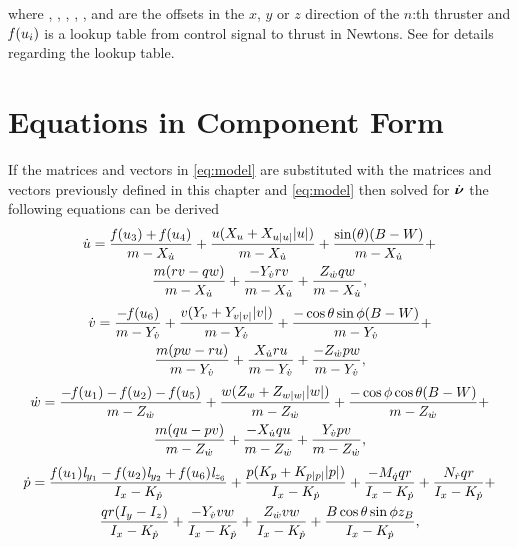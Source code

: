 where , , , , ,  and  are the offsets in the $x$, $y$ or $z$ direction of the $n$:th thruster and $\mathit{f}(u_{i})$ is a lookup table from control signal to thrust in Newtons. See  for details regarding the lookup table.

\section{Equations in Component Form}
If the matrices and vectors in \eqref{eq:model} are substituted with the matrices and vectors previously defined in this chapter and \eqref{eq:model} then solved for $\dot{\boldsymbol{\nu}}$ the following equations can be derived 
\begin{multline} \label{eq:u_dot}
\dot{u} = \frac{\mathit{f}(u_{3}) + \mathit{f}(u_{4})}{m -X_{\dot{u}}} + \frac{u (X_{u} + X_{u|u|} |u|)}{m -X_{\dot{u}}} + \frac{\sin(\theta)(B - W)}{m -X_{\dot{u}}} +\\
\frac{m(r v - q w )}{m -X_{\dot{u}}} + \frac{-Y_{\dot{v}} r v}{m -X_{\dot{u}}} + \frac{Z_{\dot{w}} q w}{m -X_{\dot{u}}},
\end{multline}
\begin{multline} \label{eq:v_dot}
\dot{v} = \frac{-\mathit{f}(u_{6})}{m - Y_{\dot{v}}} + \frac{v (Y_{v} + Y_{v|v|} |v|)}{m - Y_{\dot{v}}} + \frac{-\cos{\theta} \sin{\phi}(B - W)}{m - Y_{\dot{v}}} +\\ \frac{m(p w - r u)}{m - Y_{\dot{v}}} + \frac{X_{\dot{u}} r u}{m - Y_{\dot{v}}} + \frac{-Z_{\dot{w}} p w}{m - Y_{\dot{v}}},
\end{multline}
\begin{multline} \label{eq:w_dot}
\dot{w} = \frac{-\mathit{f}(u_{1}) - \mathit{f}(u_{2}) - \mathit{f}(u_{5})}{m - Z_{\dot{w}}} + \frac{w (Z_{w} + Z_{w|w|} |w|)}{m - Z_{\dot{w}}} + \frac{-\cos{\phi}\cos{\theta}(B - W)}{m - Z_{\dot{w}}} +\\
\frac{m (q u - p v)}{m - Z_{\dot{w}}} + \frac{-X_{\dot{u}} q u}{m - Z_{\dot{w}}} + \frac{Y_{\dot{v}} p v}{m - Z_{\dot{w}}},
\end{multline}
\begin{multline} \label{eq:p_dot}
\dot{p} = \frac{\mathit{f}(u_{1}) \mathit{l}_{y_{1}} - \mathit{f}(u_{2}) \mathit{l}_{y_{2}} + \mathit{f}(u_{6}) \mathit{l}_{z_{6}}}{I_{x} - K_{\dot{p}}} + \frac{p (K_{p} + K_{p|p|} |p|)}{I_{x} - K_{\dot{p}}} + \frac{-M_{\dot{q}} q r}{I_{x} - K_{\dot{p}}} + \frac{N_{\dot{r}} q r}{I_{x} - K_{\dot{p}}} +\\
\frac{q r (I_{y} - I_{z})}{I_{x} - K_{\dot{p}}} + \frac{- Y_{\dot{v}} v w}{I_{x} - K_{\dot{p}}} + \frac{Z_{\dot{w}} v w}{I_{x} - K_{\dot{p}}} + \frac{B \cos{\theta} \sin{\phi} z_B}{I_{x} - K_{\dot{p}}},
\end{multline}
